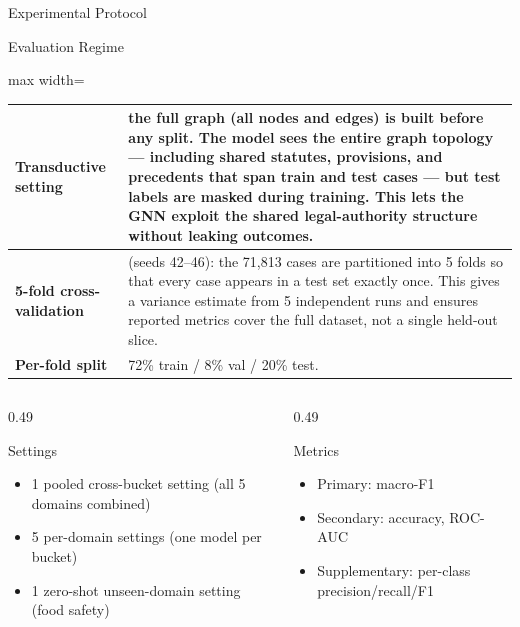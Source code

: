 \documentclass[aspectratio=169,11pt]{beamer}
\newenvironment{tightitemize}{
  \begin{itemize}
    \setlength{\itemsep}{2pt}
    \setlength{\parskip}{0pt}
}{\end{itemize}}
\begin{document}
\begin{frame}{Experimental Protocol}
  \scriptsize
  \begin{block}{Evaluation Regime}
    \setlength{\tabcolsep}{4pt}
    \renewcommand{\arraystretch}{1.15}
    \begin{adjustbox}{max width=\textwidth}
      \begin{tabular}{p{3.3cm}p{10.7cm}}
        \toprule
        \textbf{Transductive setting} & the full graph (all nodes and edges) is built before any split. The model sees the entire graph topology --- including shared statutes, provisions, and precedents that span train and test cases --- but test labels are masked during training. This lets the GNN exploit the shared legal-authority structure without leaking outcomes. \\
        \midrule
        \textbf{5-fold cross-validation} & (seeds 42--46): the 71{,}813 cases are partitioned into 5 folds so that every case appears in a test set exactly once. This gives a variance estimate from 5 independent runs and ensures reported metrics cover the full dataset, not a single held-out slice. \\
        \midrule
        \textbf{Per-fold split} & 72\% train / 8\% val / 20\% test. \\
        \bottomrule
      \end{tabular}
    \end{adjustbox}
  \end{block}

  \vspace{0.4em}
  \begin{columns}[T,onlytextwidth]
    \begin{column}{0.49\textwidth}
      \begin{block}{Settings}
        \begin{tightitemize}
          \item 1 pooled cross-bucket setting (all 5 domains combined)
          \item 5 per-domain settings (one model per bucket)
          \item 1 zero-shot unseen-domain setting (food safety)
        \end{tightitemize}
      \end{block}
    \end{column}
    \begin{column}{0.49\textwidth}
      \begin{block}{Metrics}
        \begin{tightitemize}
          \item Primary: macro-F1
          \item Secondary: accuracy, ROC-AUC
          \item Supplementary: per-class precision/recall/F1
        \end{tightitemize}
      \end{block}
    \end{column}
  \end{columns}
\end{frame}
\end{document}
